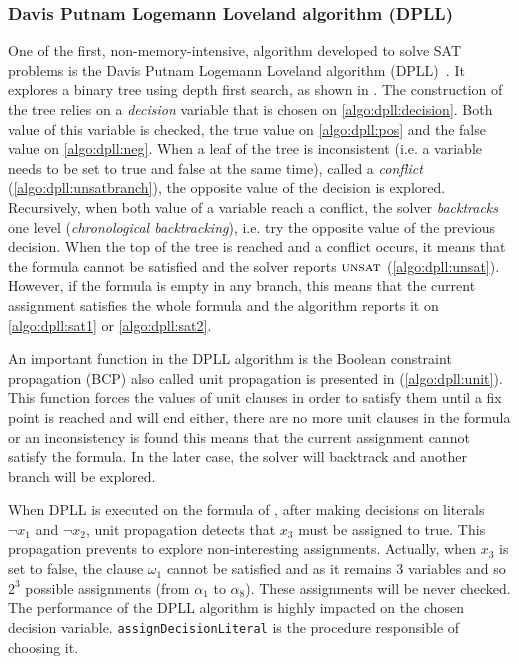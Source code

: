 \subsubsection{Davis Putnam Logemann Loveland algorithm (DPLL)}\label{sec:dpll}
One of the first, non-memory-intensive, algorithm developed to solve SAT problems is 
the Davis Putnam Logemann Loveland algorithm (DPLL)~\cite{dpll_62}. 
It explores a binary tree using depth first search, as shown in .
The construction of the tree  relies on a \emph{decision} variable  that is chosen on \cref{algo:dpll:decision}.
Both value of this variable is checked, the true value on \cref{algo:dpll:pos} and the false value on \cref{algo:dpll:neg}.
When a leaf of the tree is inconsistent (i.e. a variable needs to be set to true and false at the same time), called a \textit{conflict}
 (\cref{algo:dpll:unsatbranch}), the opposite value of the decision is explored.
Recursively, when both value of a variable reach a conflict,
the solver \emph{backtracks} one level (\emph{chronological backtracking}), i.e. try the opposite value of 
the previous decision.
When the top of the tree is reached and a conflict occurs, it means that the formula cannot be satisfied and the 
solver reports $\textsc{unsat}$ (\cref{algo:dpll:unsat}). However, if the formula is empty in any branch, 
this means that the current assignment satisfies the whole formula and the algorithm reports it on \cref{algo:dpll:sat1}
or \ref{algo:dpll:sat2}.

An important function in the DPLL algorithm is the Boolean constraint propagation (BCP) also called unit propagation
is presented in (\cref{algo:dpll:unit}).
This function forces the values of unit clauses in order to satisfy them
until a fix point is reached and will end either, there
are no more unit clauses in the formula or an inconsistency 
is found this means that the current assignment cannot satisfy the formula. 
In the later case, the solver will backtrack and another branch will be explored.

When DPLL is executed on the formula of , after making decisions on literals
$\neg x_1$ and $\neg x_2$, unit propagation detects that $x_3$ must be assigned to true.
This propagation prevents to explore non-interesting assignments. Actually, when $x_3$ is set to false,
the clause $\omega_1$ cannot be satisfied and as it remains 3 variables and so $2^3$ possible assignments
(from $\alpha_1$ to $\alpha_8$). These assignments will be never checked.
The performance of the DPLL algorithm is highly impacted on the chosen decision variable.
\texttt{assignDecisionLiteral} is the procedure responsible of choosing it.
